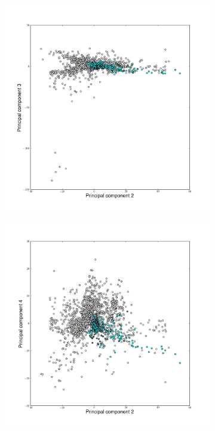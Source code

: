 \begin{landscape}
\begin{figure}
\begin{flushleft}
\begin{subfigure}[t]{0.42\textwidth}
	\end{subfigure}
	\\
	\hspace{-2cm}
	\begin{subfigure}[t]{0.42\textwidth}
	\includegraphics[width=1\textwidth]{./img/PCAcoor12.png}
	\end{subfigure}
	\begin{subfigure}[t]{0.42\textwidth}
	\includegraphics[width=1\textwidth]{./img/PCAcoor13.png}

\end{subfigure}
\end{flushleft}
\end{figure}
\end{landscape}
